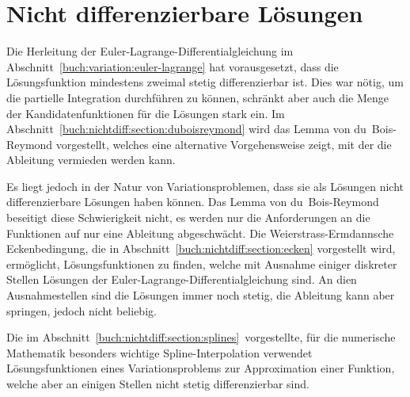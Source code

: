 %
%
%
\chapter{Nicht differenzierbare Lösungen
\label{buch:chapter:nichtdiff}}
Die Herleitung der Euler-Lagrange-Differentialgleichung im
Abschnitt~\ref{buch:variation:euler-lagrange} hat vorausgesetzt,
dass die Lösungsfunktion mindestens zweimal stetig differenzierbar ist.
Dies war nötig, um die partielle Integration durchführen zu können,
schränkt aber auch die Menge der Kandidatenfunktionen für die Lösungen
stark ein.
Im Abschnitt~\ref{buch:nichtdiff:section:duboisreymond} wird 
das Lemma von du~Bois-Reymond vorgestellt, welches eine alternative
Vorgehensweise zeigt, mit der die Ableitung vermieden werden kann.

Es liegt jedoch in der Natur von Variationsproblemen, dass sie 
als Lösungen nicht differenzierbare Lösungen haben können.
Das Lemma von du~Bois-Reymond beseitigt diese Schwierigkeit
nicht, es werden nur die Anforderungen an die Funktionen auf 
nur eine Ableitung abgeschwächt.
Die Weierstrass-Ermdannsche Eckenbedingung, die in
Abschnitt~\ref{buch:nichtdiff:section:ecken} vorgestellt
wird, ermöglicht, Lösungsfunktionen zu finden, welche mit Ausnahme
einiger diskreter Stellen Lösungen der Euler-Lagrange-Differentialgleichung
sind.
An dien Ausnahmestellen sind die Lösungen immer noch stetig, die
Ableitung kann aber springen, jedoch nicht beliebig.

Die im Abschnitt~\ref{buch:nichtdiff:section:splines} vorgestellte,
für die numerische Mathematik besonders wichtige
Spline-Interpolation verwendet Lösungsfunktionen eines
Variationsproblems zur Approximation einer Funktion, welche aber an
einigen Stellen nicht stetig differenzierbar sind.






\uebungsabschnitt

\begin{uebungsaufgaben}
\end{uebungsaufgaben}
\enduebungsabschnitt

